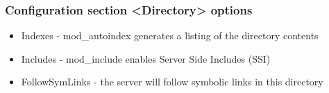 \begin{frame}[fragile]
        \frametitle{Configuration section <Directory> options}

 

\begin{itemize}
	\item Indexes  - mod\_autoindex generates a listing of the directory contents
	\item Includes - mod\_include enables Server Side Includes (SSI)
	\item FollowSymLinks - the server will follow symbolic links in this directory
\end{itemize}
\end{frame}
